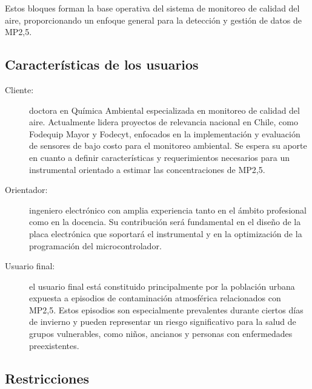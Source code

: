 \documentclass[
11pt, %
codirector, %
]{charter}
\begin{document}
Estos bloques forman la base operativa del sistema de monitoreo de calidad del aire, proporcionando un enfoque general para la detección y gestión de datos de MP2,5.


\subsection{Características de los usuarios}
\label{sec:orga40b0ee}


\begin{description}
	\item [Cliente:] doctora en Química Ambiental especializada en monitoreo de calidad del aire. Actualmente lidera proyectos de relevancia nacional en Chile, como Fodequip Mayor y Fodecyt, enfocados en la implementación y evaluación de sensores de bajo costo para el monitoreo ambiental. Se espera su aporte en cuanto a definir características y requerimientos necesarios para un instrumental orientado a estimar las concentraciones de MP2,5.
	\item [Orientador:] ingeniero electrónico con amplia experiencia tanto en el ámbito profesional como en la docencia. Su contribución será fundamental en el diseño de la placa electrónica que soportará el instrumental y en la optimización de la programación del microcontrolador.
	
	\item [Usuario final:] el usuario final está constituido principalmente por la población urbana expuesta a episodios de contaminación atmosférica relacionados con MP2,5. Estos episodios son especialmente prevalentes durante ciertos días de invierno y pueden representar un riesgo significativo para la salud de grupos vulnerables, como niños, ancianos y personas con enfermedades preexistentes.
\end{description}


\subsection{Restricciones}
\label{sec:org5ca5790}
\end{document}
